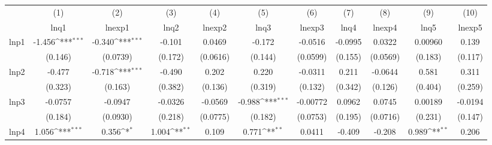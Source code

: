 {
\def\sym#1{\ifmmode^{#1}\else\(^{#1}\)\fi}
\begin{tabular}{l*{10}{c}}
\hline\hline
            &\multicolumn{1}{c}{(1)}&\multicolumn{1}{c}{(2)}&\multicolumn{1}{c}{(3)}&\multicolumn{1}{c}{(4)}&\multicolumn{1}{c}{(5)}&\multicolumn{1}{c}{(6)}&\multicolumn{1}{c}{(7)}&\multicolumn{1}{c}{(8)}&\multicolumn{1}{c}{(9)}&\multicolumn{1}{c}{(10)}\\
            &\multicolumn{1}{c}{lnq1}&\multicolumn{1}{c}{lnexp1}&\multicolumn{1}{c}{lnq2}&\multicolumn{1}{c}{lnexp2}&\multicolumn{1}{c}{lnq3}&\multicolumn{1}{c}{lnexp3}&\multicolumn{1}{c}{lnq4}&\multicolumn{1}{c}{lnexp4}&\multicolumn{1}{c}{lnq5}&\multicolumn{1}{c}{lnexp5}\\
\hline
lnp1        &      -1.456\sym{***}&      -0.340\sym{***}&      -0.101         &      0.0469         &      -0.172         &     -0.0516         &     -0.0995         &      0.0322         &     0.00960         &       0.139         \\
            &     (0.146)         &    (0.0739)         &     (0.172)         &    (0.0616)         &     (0.144)         &    (0.0599)         &     (0.155)         &    (0.0569)         &     (0.183)         &     (0.117)         \\
[1em]
lnp2        &      -0.477         &      -0.718\sym{***}&      -0.490         &       0.202         &       0.220         &     -0.0311         &       0.211         &     -0.0644         &       0.581         &       0.311         \\
            &     (0.323)         &     (0.163)         &     (0.382)         &     (0.136)         &     (0.319)         &     (0.132)         &     (0.342)         &     (0.126)         &     (0.404)         &     (0.259)         \\
[1em]
lnp3        &     -0.0757         &     -0.0947         &     -0.0326         &     -0.0569         &      -0.988\sym{***}&    -0.00772         &      0.0962         &      0.0745         &     0.00189         &     -0.0194         \\
            &     (0.184)         &    (0.0930)         &     (0.218)         &    (0.0775)         &     (0.182)         &    (0.0753)         &     (0.195)         &    (0.0716)         &     (0.231)         &     (0.147)         \\
[1em]
lnp4        &       1.056\sym{***}&       0.356\sym{*}  &       1.004\sym{**} &       0.109         &       0.771\sym{**} &      0.0411         &      -0.409         &      -0.208         &       0.989\sym{**} &       0.206         \\

\end{tabular}}
